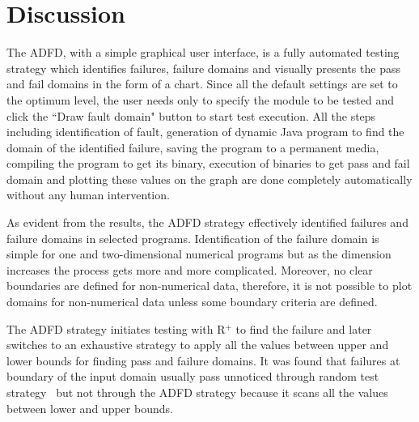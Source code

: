 



\section{Discussion} \label{sec:discussion4}

The ADFD, with a simple graphical user interface, is a fully automated testing strategy which identifies failures, failure domains and visually presents the pass and fail domains in the form of a chart. Since all the default settings are set to the optimum level, the user needs only to specify the module to be tested and click the ``Draw fault domain" button to start test execution. All the steps including identification of fault, generation of dynamic Java program to find the domain of the identified failure, saving the program to a permanent media, compiling the program to get its binary, execution of binaries to get pass and fail domain and plotting these values on the graph are done completely automatically without any human intervention.

As evident from the results, the ADFD strategy effectively identified failures and failure domains in selected programs. Identification of the failure domain is simple for one and two-dimensional numerical programs but as the dimension increases the process gets more and more complicated. Moreover, no clear boundaries are defined for non-numerical data, therefore, it is not possible to plot domains for non-numerical data unless some boundary criteria are defined.

The ADFD strategy initiates testing with R$^+$ to find the failure and later switches to an exhaustive strategy to apply all the values between upper and lower bounds for finding pass and failure domains. It was found that failures at boundary of the input domain usually pass unnoticed through random test strategy~\cite{reid1997empirical} but not through the ADFD strategy because it scans all the values between lower and upper bounds.


